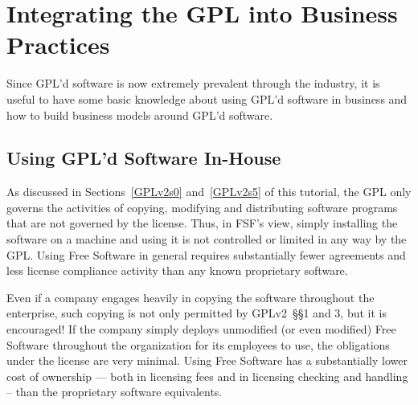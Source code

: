 


\chapter{Integrating the GPL into Business Practices}

Since GPL'd software is now extremely prevalent through the industry, it
is useful to have some basic knowledge about using GPL'd software in
business and how to build business models around GPL'd software.

\section{Using GPL'd Software In-House}

As discussed in Sections~\ref{GPLv2s0} and~\ref{GPLv2s5} of this tutorial,
the GPL only governs the activities of copying, modifying and
distributing software programs that are not governed by the license.
Thus, in FSF's view, simply installing the software on a machine and
using it is not controlled or limited in any way by the GPL\@. Using Free
Software in general requires substantially fewer agreements and less
license compliance activity than any known proprietary software.

Even if a company engages heavily in copying the software throughout the
enterprise, such copying is not only permitted by GPLv2~\S\S1 and 3, but it is
encouraged!  If the company simply deploys unmodified (or even modified)
Free Software throughout the organization for its employees to use, the
obligations under the license are very minimal. Using Free Software has a
substantially lower cost of ownership --- both in licensing fees and in
licensing checking and handling -- than the proprietary software
equivalents.

